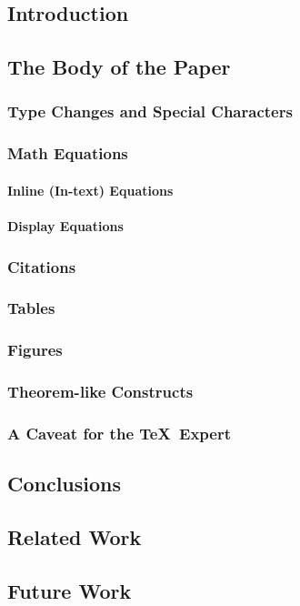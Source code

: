 \documentclass{sig-alternate}
\begin{document}
\subsection{Introduction}
\subsection{The Body of the Paper}
\subsubsection{Type Changes and  Special Characters}
\subsubsection{Math Equations}
\paragraph{Inline (In-text) Equations}
\paragraph{Display Equations}
\subsubsection{Citations}
\subsubsection{Tables}
\subsubsection{Figures}
\subsubsection{Theorem-like Constructs}
\subsubsection*{A Caveat for the \TeX\ Expert}
\subsection{Conclusions}
\subsection{Related Work}
\subsection{Future Work}
\end{document}
